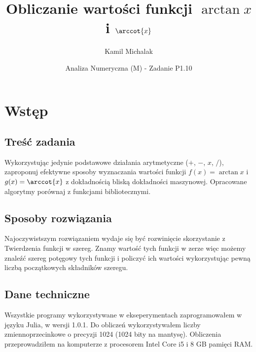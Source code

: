\documentclass[11pt,a4paper]{article}
\title{Obliczanie wartości funkcji $\arctan{x}$ i $\arccot{x}$}
\author{Kamil Michalak}
\date{Analiza Numeryczna (M) - Zadanie P1.10}
\begin{document}
    \maketitle
    \section{Wstęp}
    \subsection{Treść zadania}
    Wykorzystując jedynie podstawowe działania arytmetyczne ($+$, $-$, $x$, $/$), zaproponuj efektywne sposoby wyznaczania wartości funkcji $f(x) = \arctan{x}$ i $g(x) = \arccot{x}$ z dokładnością bliską dokładności maszynowej. Opracowane algorytmy porównaj z funkcjami bibliotecznymi.
    \subsection{Sposoby rozwiązania}
    Najoczywistszym rozwiązaniem wydaje się być rozwinięcie skorzystanie z Twierdzenia funkcji w szereg. Znamy wartość tych funkcji w zerze więc możemy znaleźć szereg potęgowy tych funkcji i policzyć ich wartości wykorzystując pewną liczbą początkowych składników szeregu.
    \subsection{Dane techniczne}
    Wszystkie programy wykorzystywane w ekseperymentach zaprogramowałem w języku Julia, w wersji 1.0.1. Do obliczeń wykorzystywałem liczby zmiennoprzecinkowe o precyzji 1024 (1024 bity na mantysę). Obliczenia przeprowadziłem na komputerze z procesorem Intel Core i5 i 8 GB pamięci RAM.
\end{document}

